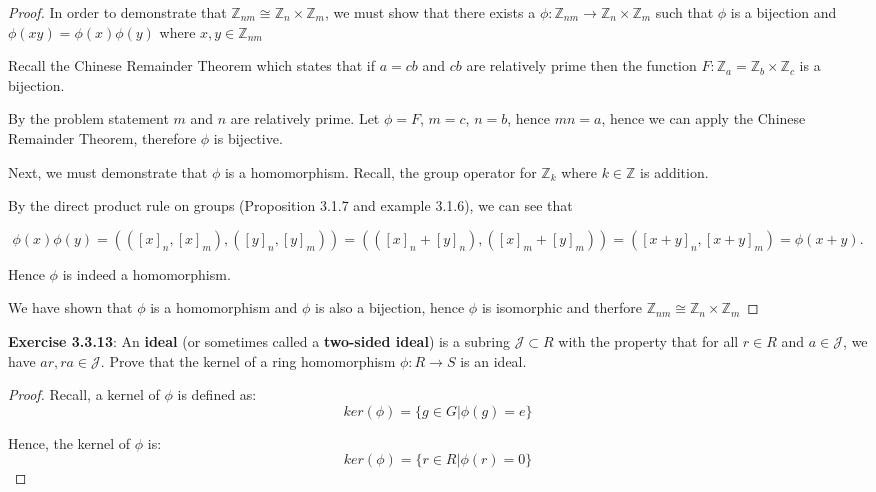 \documentclass[a4paper]{article}
\begin{document}
\begin{myparindent}{0pt}
\begin{proof}
  In order to demonstrate that $\mathbb{Z}_{nm} \cong \mathbb{Z}_n \times \mathbb{Z}_m$,
  we must show that there exists a $\phi: \mathbb{Z}_{nm} \rightarrow \mathbb{Z}_n \times \mathbb{Z}_m$
  such that $\phi$ is a bijection and $\phi(xy) = \phi(x) \phi(y)$ where $x, y \in \mathbb{Z}_{nm}$ \newline

  Recall the Chinese Remainder Theorem which states that if $a = cb$ and $cb$
  are relatively prime then the function $F: \mathbb{Z}_a = \mathbb{Z}_b \times \mathbb{Z}_c$
  is a bijection. \newline

  By the problem statement $m$ and $n$ are relatively prime. Let $\phi = F$, $m = c$, $n = b$,
  hence $mn = a$, hence we can apply the Chinese Remainder Theorem, therefore $\phi$
  is bijective. \newline

  Next, we must demonstrate that $\phi$ is a homomorphism. Recall, the group
  operator for $\mathbb{Z}_k$ where $k \in \mathbb{Z}$ is addition. \newline

  By the direct product rule on groups (Proposition 3.1.7 and example 3.1.6), we
  can see that

  \[ \phi(x) \phi(y) = (([x]_n, [x]_m), ([y]_n, [y]_m)) = (([x]_n + [y]_n), ([x]_m + [y]_m)) = ([x + y]_n, [x + y]_m) = \phi(x + y). \]

  Hence $\phi$ is indeed a homomorphism. \newline

  We have shown that $\phi$ is a homomorphism and $\phi$ is also a bijection,
  hence $\phi$ is isomorphic and therfore $\mathbb{Z}_{nm} \cong \mathbb{Z}_n \times \mathbb{Z}_m$
\end{proof}

\textbf{Exercise 3.3.13}:
An \textbf{ideal} (or sometimes called a \textbf{two-sided ideal}) is a
subring $\mathcal{J} \subset R$ with the property that for all
$r \in R$ and $a \in \mathcal{J}$, we have $ar, ra \in \mathcal{J}$.
Prove that the kernel of a ring homomorphism $\phi: R \rightarrow S$ is an ideal.
\newline

\begin{proof}
  Recall, a kernel of $\phi$ is defined as:
  \[ ker(\phi) = \{ g \in G | \phi(g) = e \} \]

  Hence, the kernel of $\phi$ is:
  \[ ker(\phi) = \{ r \in R | \phi(r) = 0 \} \]


\end{proof}
\end{myparindent}
\end{document}
